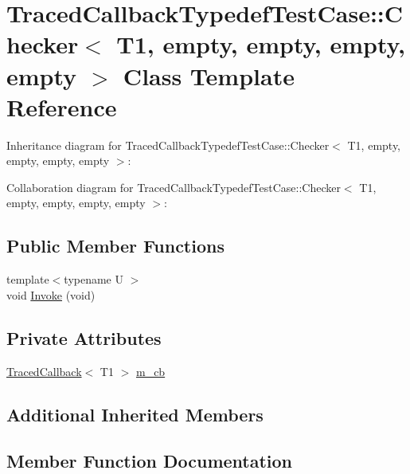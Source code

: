 \hypertarget{classTracedCallbackTypedefTestCase_1_1Checker_3_01T1_00_01empty_00_01empty_00_01empty_00_01empty_01_4}{}\section{Traced\+Callback\+Typedef\+Test\+Case\+:\+:Checker$<$ T1, empty, empty, empty, empty $>$ Class Template Reference}
\label{classTracedCallbackTypedefTestCase_1_1Checker_3_01T1_00_01empty_00_01empty_00_01empty_00_01empty_01_4}


Inheritance diagram for Traced\+Callback\+Typedef\+Test\+Case\+:\+:Checker$<$ T1, empty, empty, empty, empty $>$\+:


Collaboration diagram for Traced\+Callback\+Typedef\+Test\+Case\+:\+:Checker$<$ T1, empty, empty, empty, empty $>$\+:
\subsection*{Public Member Functions}
\begin{DoxyCompactItemize}
\item 
{\footnotesize template$<$typename U $>$ }\\void \hyperlink{classTracedCallbackTypedefTestCase_1_1Checker_3_01T1_00_01empty_00_01empty_00_01empty_00_01empty_01_4_aceeb5228d70d0f5110a05c19424bb2e6}{Invoke} (void)
\end{DoxyCompactItemize}
\subsection*{Private Attributes}
\begin{DoxyCompactItemize}
\item 
\hyperlink{classns3_1_1TracedCallback}{Traced\+Callback}$<$ T1 $>$ \hyperlink{classTracedCallbackTypedefTestCase_1_1Checker_3_01T1_00_01empty_00_01empty_00_01empty_00_01empty_01_4_af5731518e488980c5e381659ae32ae8d}{m\+\_\+cb}
\end{DoxyCompactItemize}
\subsection*{Additional Inherited Members}


\subsection{Member Function Documentation}
